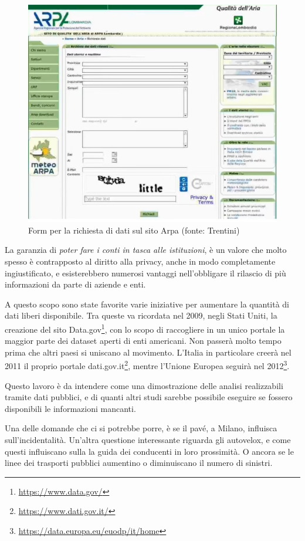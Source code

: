 \documentclass[a4paper,12pt]{report}
\newcommand{\quotestyle}[1]{\textit{#1}}
\newcommand{\skipline}{\vspace{0.2in}}
\begin{document}
\begin{figure}
    \hfill\includegraphics[width=0.7\linewidth]{img/arpa.png}\hspace*{\fill}
    \caption{Form per la richiesta di dati sul sito Arpa (fonte: Trentini)}
    \label{fig:arpa}
\end{figure}

La garanzia di \quotestyle{poter fare i conti in tasca alle istituzioni}, è un 
valore che molto spesso è contrapposto al diritto alla privacy, anche in 
modo completamente ingiustificato, e esisterebbero numerosi vantaggi nell'obbligare 
il rilascio di più informazioni da parte di aziende e enti. 

A questo scopo sono state favorite varie iniziative per aumentare la quantità di 
dati liberi disponibile. 
Tra queste va ricordata nel 2009, negli Stati Uniti, la creazione del sito 
Data.gov\footnote{\url{https://www.data.gov/}}, 
con lo scopo di raccogliere in un unico portale la maggior parte dei dataset 
aperti di enti americani. 
Non passerà molto tempo prima che altri paesi si uniscano al movimento. 
L'Italia in particolare creerà nel 2011 il proprio portale 
dati.gov.it\footnote{\url{https://www.dati.gov.it/}}, mentre l'Unione Europea seguirà 
nel 2012\footnote{\url{https://data.europa.eu/euodp/it/home}}.

\skipline
Questo lavoro è da intendere come una dimostrazione delle analisi realizzabili 
tramite dati pubblici, e di quanti altri studi sarebbe possibile eseguire se fossero 
disponibili le informazioni mancanti.

Una delle domande che ci si potrebbe porre, è se il pavé, a Milano, 
influisca sull'incidentalità.
Un'altra questione interessante riguarda gli autovelox, e come questi influiscano sulla 
la guida dei conducenti in loro prossimità. 
O ancora se le linee dei trasporti pubblici aumentino o diminuiscano il numero di sinistri.
\end{document}
